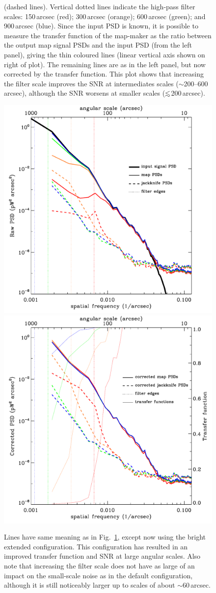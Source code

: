 \documentclass[useAMS,usenatbib,nofootinbib]{mn2e}
\def\lsim{\mathrel{\lower2.5pt\vbox{\lineskip=0pt\baselineskip=0pt
          \hbox{$<$}\hbox{$\sim$}}}}
\begin{document}
\begin{figure}
{(dashed lines). Vertical dotted lines indicate the high-pass filter
scales: 150\,arcsec (red); 300\,arcsec (orange); 600\,arcsec (green);
and 900\,arcsec (blue). Since the input PSD is known, it is possible
to measure the transfer function of the map-maker as the ratio between
the output map signal PSDs and the input PSD (from the left panel),
giving the thin coloured lines (linear vertical axis shown on right of
plot). The remaining lines are as in the left panel, but now corrected
by the transfer function. This plot shows that increasing the filter
scale improves the SNR at intermediates scales
($\sim$200--600\,arcsec), although the SNR worsens at smaller scales
($\lsim$200\,arcsec).}
\label{fig:m17_def_ps}
\end{figure}

\begin{figure}
\centering
\includegraphics[width=0.49\linewidth]{pspec_m17_bright_extended.pdf}
\includegraphics[width=0.49\linewidth]{cor_pspec_m17_bright_extended.pdf}
\caption{Lines have same meaning as in Fig.~\ref{fig:m17_def_ps},
except now using the bright extended configuration. This configuration
has resulted in an improved transfer function and SNR at large angular
scales. Also note that increasing the filter scale does not have as
large of an impact on the small-scale noise as in the default
configuration, although it is still noticeably larger up to scales of
about $\sim$60\,arcsec.}
\label{fig:m17_be_ps}
\end{figure}
\end{document}
